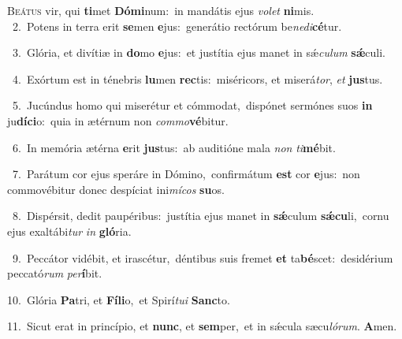 \lettrine{\initial\textcolor{\initialcolor}{B}}{eátus} vir, qui \textbf{ti}\-met \textbf{Dó}\-\textbf{mi}num:~\star in mandátis ejus \textit{vo}\-\textit{let} \textbf{ni}\-mis.\\
{\numbfont\textcolor{\numbcolor}{~2.}}~Potens in terra erit \textbf{se}\-men \textbf{e}\-jus:~\star generátio rectórum be\-\textit{ne}\-\textit{di}\textbf{cé}tur.\par
{\numbfont\textcolor{\numbcolor}{~3.}}~Glória, et divítiæ in \textbf{do}\-mo \textbf{e}\-jus:~\star et justítia ejus manet in sǽ\-\textit{cu}\-\textit{lum} \textbf{sǽ}\-culi.\par
{\numbfont\textcolor{\numbcolor}{~4.}}~Exórtum est in ténebris \textbf{lu}\-men \textbf{rec}\-tis:~\star miséricors, et miserá\-\textit{tor}\-, \textit{et} \textbf{jus}\-tus.\par
{\numbfont\textcolor{\numbcolor}{~5.}}~Jucúndus homo qui miserétur et cómmodat,~\dagger dispónet sermónes suos \textbf{in} ju\-\textbf{dí}\-\textbf{ci}o:~\star quia in ætérnum non \textit{com}\-\textit{mo}\textbf{vé}bitur.\par
{\numbfont\textcolor{\numbcolor}{~6.}}~In memória ætérna \textbf{e}\-rit \textbf{jus}\-tus:~\star ab auditióne mala \textit{non} \textit{ti}\-\textbf{mé}bit.\par
{\numbfont\textcolor{\numbcolor}{~7.}}~Parátum cor ejus speráre in Dómino,~\dagger confirmátum \textbf{est} cor \textbf{e}\-jus:~\star non commovébitur donec despíciat ini\-\textit{mí}\-\textit{cos} \textbf{su}\-os.\par
{\numbfont\textcolor{\numbcolor}{~8.}}~Dispérsit, dedit paupéribus:~\dagger justítia ejus manet in \textbf{sǽ}\-culum \textbf{sǽ}\-\textbf{cu}li,~\star cornu ejus exaltábi\textit{tur} \textit{in} \textbf{gló}\-ria.\par
{\numbfont\textcolor{\numbcolor}{~9.}}~Peccátor vidébit, et irascétur,~\dagger déntibus suis fremet \textbf{et} ta\-\textbf{bé}\-scet:~\star desidérium peccató\textit{rum} \textit{per}\-\textbf{í}bit.\par
{\numbfont\textcolor{\numbcolor}{10.}}~Glória \textbf{Pa}\-tri, et \textbf{Fí}\-\textbf{li}o,~\star et Spirí\-\textit{tu}\-\textit{i} \textbf{Sanc}\-to.\par
{\numbfont\textcolor{\numbcolor}{11.}}~Sicut erat in princípio, et \textbf{nunc}\-, et \textbf{sem}\-per,~\star et in sǽcula sæcu\-\textit{ló}\-\textit{rum}. \textbf{A}\-men.\par
